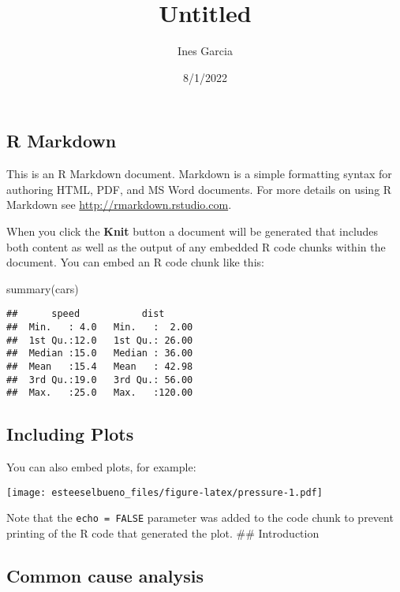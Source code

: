 \documentclass[
]{article}
\title{Untitled}
\author{Ines Garcia}
\date{8/1/2022}
\newenvironment{Shaded}{\begin{snugshade}}{\end{snugshade}}
\newcommand{\FunctionTok}[1]{\textcolor[rgb]{0.00,0.00,0.00}{#1}}
\newcommand{\NormalTok}[1]{#1}
\begin{document}
\maketitle

\hypertarget{r-markdown}{%
\subsection{R Markdown}\label{r-markdown}}

This is an R Markdown document. Markdown is a simple formatting syntax
for authoring HTML, PDF, and MS Word documents. For more details on
using R Markdown see \url{http://rmarkdown.rstudio.com}.

When you click the \textbf{Knit} button a document will be generated
that includes both content as well as the output of any embedded R code
chunks within the document. You can embed an R code chunk like this:

\begin{Shaded}
\begin{Highlighting}[]
\FunctionTok{summary}\NormalTok{(cars)}
\end{Highlighting}
\end{Shaded}

\begin{verbatim}
##      speed           dist       
##  Min.   : 4.0   Min.   :  2.00  
##  1st Qu.:12.0   1st Qu.: 26.00  
##  Median :15.0   Median : 36.00  
##  Mean   :15.4   Mean   : 42.98  
##  3rd Qu.:19.0   3rd Qu.: 56.00  
##  Max.   :25.0   Max.   :120.00
\end{verbatim}

\hypertarget{including-plots}{%
\subsection{Including Plots}\label{including-plots}}

You can also embed plots, for example:

\texttt{[image: esteeselbueno\_files/figure-latex/pressure-1.pdf]}

Note that the \texttt{echo\ =\ FALSE} parameter was added to the code
chunk to prevent printing of the R code that generated the plot. \#\#
Introduction

\hypertarget{common-cause-analysis}{%
\subsection{Common cause analysis}\label{common-cause-analysis}}
\end{document}
